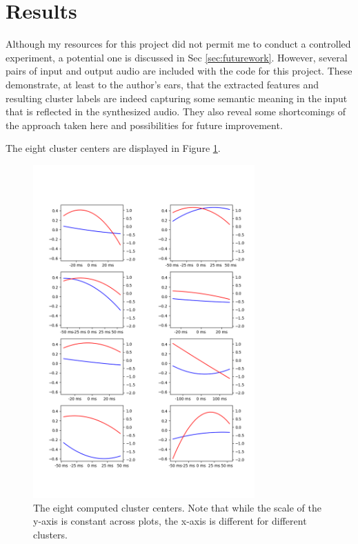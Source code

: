 \documentclass{article}
\begin{document}
\section{Results}
\label{sec:results}

Although my resources for this project did not permit me to conduct a controlled experiment, a potential one is discussed in Sec \ref{sec:futurework}.
However, several pairs of input and output audio are included with the code for this project.
These demonstrate, at least to the author's ears, that the extracted features and resulting cluster labels are indeed capturing some semantic meaning in the input that is reflected in the synthesized audio.
They also reveal some shortcomings of the approach taken here and possibilities for future improvement.

The eight cluster centers are displayed in Figure \ref{fig:clustercenters}.

\begin{figure}[htb]

\begin{minipage}[b]{1.0\linewidth}
  \centering
  \centerline{\includegraphics[width=8.5cm]{cluster_centers.png}}
\end{minipage}
\caption{The eight computed cluster centers. Note that while the scale of the y-axis is constant across plots, the x-axis is different for different clusters.}
\label{fig:clustercenters}
\end{figure}
\end{document}

